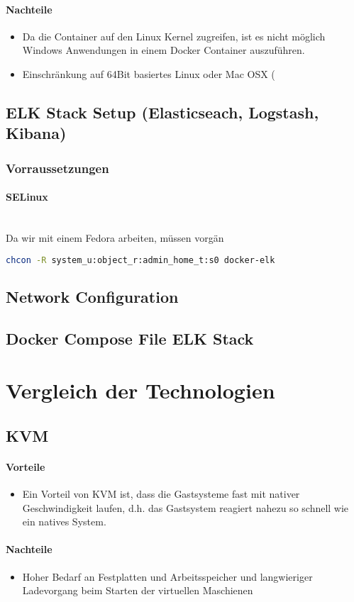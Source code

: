\paragraph{Nachteile}
\begin{itemize}
	\item Da die Container auf den Linux Kernel zugreifen, ist es nicht möglich Windows Anwendungen in einem Docker Container auszuführen.
	\item Einschränkung auf 64Bit basiertes Linux oder Mac OSX (%
\end{itemize}

\subsection{ELK Stack Setup (Elasticseach, Logstash, Kibana)}
\subsubsection{Vorraussetzungen}
\paragraph{SELinux} \hfill \\
Da wir mit einem Fedora arbeiten, müssen vorgän
\begin{lstlisting}[language=bash]
chcon -R system_u:object_r:admin_home_t:s0 docker-elk
\end{lstlisting}



\subsection{Network Configuration}

\subsection{Docker Compose File ELK Stack}




\section{Vergleich der Technologien}

\subsection{KVM} %
\paragraph{Vorteile}
\begin{itemize}
	\item Ein Vorteil von KVM ist, dass die Gastsysteme fast mit nativer Geschwindigkeit laufen, d.h. das Gastsystem reagiert nahezu so schnell wie ein natives System. 
\end{itemize}
\paragraph{Nachteile}
\begin{itemize}
	\item Hoher Bedarf an Festplatten und Arbeitsspeicher und langwieriger Ladevorgang beim Starten der virtuellen Maschienen
\end{itemize}



